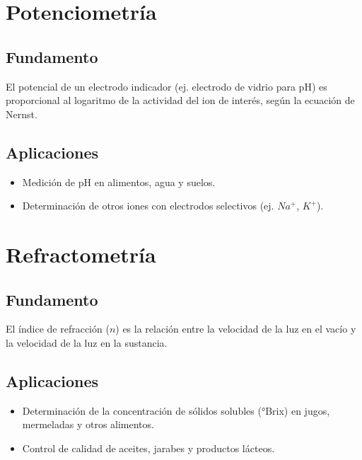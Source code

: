 \section{Potenciometría}


\subsection{Fundamento}
El potencial de un electrodo indicador (ej. electrodo de vidrio para pH) es proporcional al logaritmo de la actividad del ion de interés, según la ecuación de Nernst.

\subsection{Aplicaciones}
\begin{itemize}
    \item Medición de pH en alimentos, agua y suelos.
    \item Determinación de otros iones con electrodos selectivos (ej. $Na^+$, $K^+$).
\end{itemize}

\section{Refractometría}


\subsection{Fundamento}
El índice de refracción ($n$) es la relación entre la velocidad de la luz en el vacío y la velocidad de la luz en la sustancia.

\subsection{Aplicaciones}
\begin{itemize}
    \item Determinación de la concentración de sólidos solubles (°Brix) en jugos, mermeladas y otros alimentos.
    \item Control de calidad de aceites, jarabes y productos lácteos.
\end{itemize}

